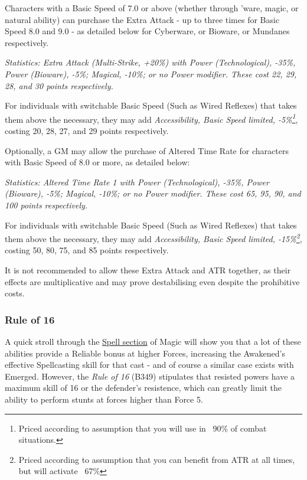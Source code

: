 \begin{multicols*}{3}
	Characters with a Basic Speed of 7.0 or above (whether through 'ware, magic, or natural ability) can purchase the Extra Attack - up to three times for Basic Speed 8.0 and 9.0 - as detailed below for Cyberware, or Bioware, or Mundanes respectively.
	
	\textit{\textcolor{OliveGreen}{Statistics: Extra Attack (Multi-Strike, +20\%) with Power (Technological), -35\%, Power (Bioware), -5\%; Magical, -10\%; or no Power modifier. These cost 22, 29, 28, and 30 points respectively.}}
	
	For individuals with switchable Basic Speed (Such as Wired Reflexes) that takes them above the necessary, they may add \textit{Accessibility, Basic Speed limited, -5\%\footnote{Priced according to assumption that you will use in ~90\% of combat situations.}}, costing 20, 28, 27, and 29 points respectively.
	
	Optionally, a GM may allow the purchase of Altered Time Rate for characters with Basic Speed of 8.0 or more, as detailed below:
	
	\textit{\textcolor{OliveGreen}{Statistics: Altered Time Rate 1 with Power (Technological), -35\%, Power (Bioware), -5\%; Magical, -10\%; or no Power modifier. These cost 65, 95, 90, and 100 points respectively.}}
	
	For individuals with switchable Basic Speed (Such as Wired Reflexes) that takes them above the necessary, they may add \textit{Accessibility, Basic Speed limited, -15\%\footnote{Priced according to assumption that you can benefit from ATR at all times, but will activate ~67\%}}, costing 50, 80, 75, and 85 points respectively. 
	
	It is not recommended to allow these Extra Attack and ATR together, as their effects are multiplicative and may prove destabilising even despite the prohibitive costs.
	
	\subsubsection{Rule of 16}
	
	A quick stroll through the \hyperref[spells]{Spell section} of Magic will show you that a lot of these abilities provide a Reliable bonus at higher Forces, increasing the Awakened's effective Spellcasting skill for that cast - and of course a similar case exists with Emerged. However, the \textit{Rule of 16} (B349) stipulates that resisted powers have a maximum skill of 16 or the defender's resistence, which can greatly limit the ability to perform stunts at forces higher than Force 5.
	

\end{multicols*}
